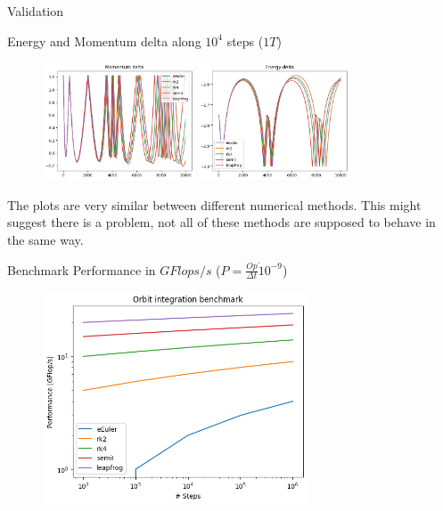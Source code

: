 \documentclass{beamer}
\begin{document}
\begin{frame}{Validation}

	Energy and Momentum delta along $10^4$ steps ($1 T$)
\begin{figure}
\centering
    \includegraphics[width=0.4\textwidth]{plots/plot_M.png}
    \includegraphics[width=0.4\textwidth]{plots/plot_E.png}
    \label{fig:question}
\end{figure}
The plots are very similar between different numerical methods.
This might suggest there is a problem, not all of these methods are supposed to behave in the same way.
\end{frame}

\begin{frame}{Benchmark}
Performance in $GFlops/s$ ($P = \frac{Op}{\Delta t} \dot 10^{-9}$)
\begin{figure}
	\centering
	\includegraphics[width = 0.7\textwidth]{plots/benchmark_plot.png}
\end{figure}
\end{frame}
\end{document}
